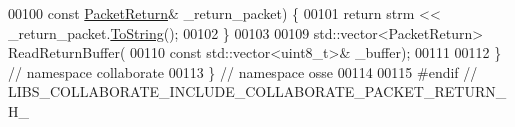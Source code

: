 \begin{DoxyCode}
00100                                 \textcolor{keyword}{const} \hyperlink{classosse_1_1collaborate_1_1_packet_return}{PacketReturn}& \_return\_packet) \{
00101   \textcolor{keywordflow}{return} strm << \_return\_packet.\hyperlink{classosse_1_1collaborate_1_1_packet_return_a415e0fd114b2460f62a6800023dafc0a}{ToString}();
00102 \}
00103 
00109 std::vector<PacketReturn> ReadReturnBuffer(
00110     \textcolor{keyword}{const} std::vector<uint8\_t>& \_buffer);
00111 
00112 \}  \textcolor{comment}{// namespace collaborate}
00113 \}  \textcolor{comment}{// namespace osse}
00114 
00115 \textcolor{preprocessor}{#endif  // LIBS\_COLLABORATE\_INCLUDE\_COLLABORATE\_PACKET\_RETURN\_H\_}
\end{DoxyCode}
